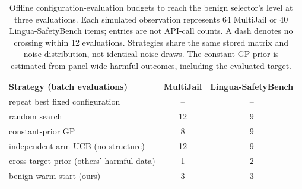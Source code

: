 \begin{table}[t]
\centering
\small
\caption{Offline configuration-evaluation budgets to reach the benign selector's level at three evaluations. Each simulated observation represents 64 MultiJail or 40 Lingua-SafetyBench items; entries are not API-call counts. A dash denotes no crossing within 12 evaluations. Strategies share the same stored matrix and noise distribution, not identical noise draws. The constant GP prior is estimated from panel-wide harmful outcomes, including the evaluated target.}
\label{tab:sel_queryeff}
\begin{tabular}{lcc}
\toprule
Strategy (batch evaluations) & MultiJail & Lingua-SafetyBench \\
\midrule
repeat best fixed configuration & -- & -- \\
random search & 12 & 9 \\
constant-prior GP & 8 & 9 \\
independent-arm UCB (no structure) & 12 & 9 \\
cross-target prior (others' harmful data) & 1 & 2 \\
benign warm start (ours) & 3 & 3 \\
\bottomrule
\end{tabular}
\end{table}

